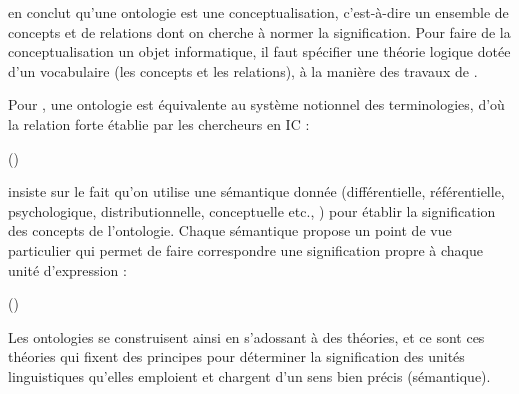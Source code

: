 \citeauthor{Charlet2002} en conclut qu'une ontologie est une conceptualisation, c'est-à-dire un ensemble de concepts et de relations dont on cherche à normer la signification. 
Pour faire de la conceptualisation un objet informatique, il faut spécifier une théorie logique dotée d'un vocabulaire (les concepts et les relations), à la manière des travaux de \cite{Guarino1995}.

Pour \citeauthor{Roche2005}, une ontologie est équivalente au système notionnel des terminologies, d'où la relation forte établie par les chercheurs en IC : 

 (\cite{Roche2005})

\citeauthor{Bachimont2000a} insiste sur le fait qu'on utilise une sémantique donnée (différentielle, référentielle, psychologique, distributionnelle, conceptuelle etc., \cite{bachimont:hdr}) pour établir la signification des concepts de l'ontologie. Chaque sémantique propose un point de vue particulier qui permet de faire correspondre une signification propre à chaque unité d'expression : 

 (\cite{Bachimont2000a})

Les ontologies se construisent ainsi en s'adossant à des théories, et ce sont ces théories qui fixent des principes pour déterminer la signification des unités linguistiques qu'elles emploient et chargent d'un sens bien précis (sémantique). 

